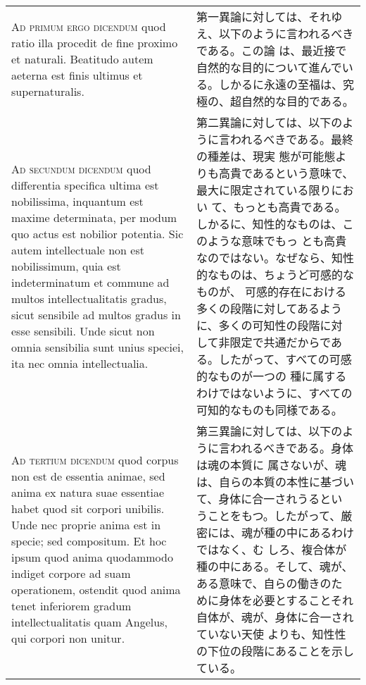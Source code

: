 \documentclass[paper=a4paper,fontsize=10pt,jafontsize=9pt,titlepage]{jlreq}
\begin{document}
\begin{longtable}{p{21em}p{21em}}
\\




{\scshape Ad primum ergo dicendum} quod ratio illa procedit de fine
 proximo et naturali. Beatitudo autem aeterna est finis ultimus et
 supernaturalis.

&

 第一異論に対しては、それゆえ、以下のように言われるべきである。この論
 は、最近接で自然的な目的について進んでいる。しかるに永遠の至福は、究
 極の、超自然的な目的である。
 
\\




{\scshape Ad secundum dicendum} quod differentia specifica ultima est
 nobilissima, inquantum est maxime determinata, per modum quo actus
 est nobilior potentia. Sic autem intellectuale non est nobilissimum,
 quia est indeterminatum et commune ad multos intellectualitatis
 gradus, sicut sensibile ad multos gradus in esse sensibili. Unde
 sicut non omnia sensibilia sunt unius speciei, ita nec omnia
 intellectualia.

&

第二異論に対しては、以下のように言われるべきである。最終の種差は、現実
態が可能態よりも高貴であるという意味で、最大に限定されている限りにおい
て、もっとも高貴である。しかるに、知性的なものは、このような意味でもっ
とも高貴なのではない。なぜなら、知性的なものは、ちょうど可感的なものが、
可感的存在における多くの段階に対してあるように、多くの可知性の段階に対
して非限定で共通だからである。したがって、すべての可感的なものが一つの
種に属するわけではないように、すべての可知的なものも同様である。
 
\\




{\scshape Ad tertium dicendum} quod corpus non est de essentia animae,
 sed anima ex natura suae essentiae habet quod sit corpori
 unibilis. Unde nec proprie anima est in specie; sed compositum. Et
 hoc ipsum quod anima quodammodo indiget corpore ad suam operationem,
 ostendit quod anima tenet inferiorem gradum intellectualitatis quam
 Angelus, qui corpori non unitur.

&

 第三異論に対しては、以下のように言われるべきである。身体は魂の本質に
 属さないが、魂は、自らの本質の本性に基づいて、身体に合一されうるとい
 うことをもつ。したがって、厳密には、魂が種の中にあるわけではなく、む
 しろ、複合体が種の中にある。そして、魂が、ある意味で、自らの働きのた
 めに身体を必要とすることそれ自体が、魂が、身体に合一されていない天使
 よりも、知性性の下位の段階にあることを示している。




\end{longtable}
\end{document}

